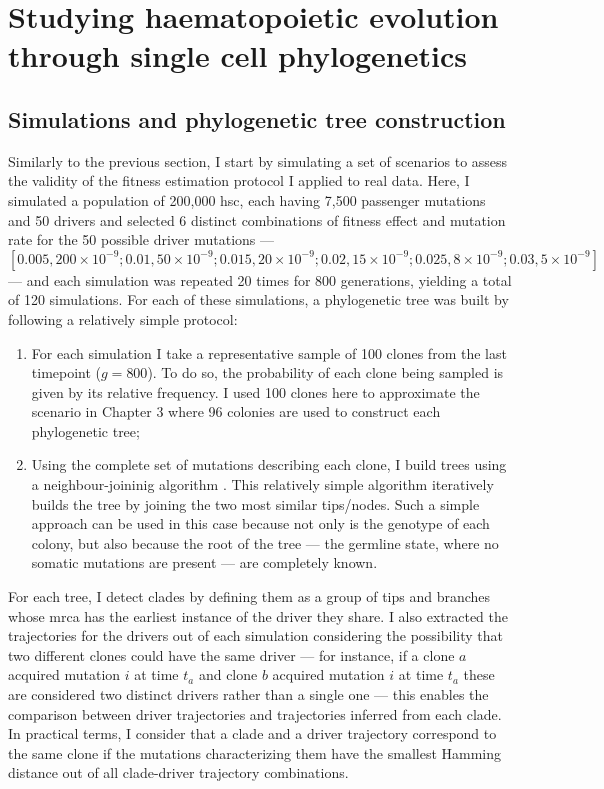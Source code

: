\section{Studying haematopoietic evolution through single cell phylogenetics}

\subsection{Simulations and phylogenetic tree construction}

Similarly to the previous section, I start by simulating a set of scenarios to assess the validity of the fitness estimation protocol I applied to real data. Here, I simulated a population of 200,000 \ac{hsc}, each having 7,500 passenger mutations and 50 drivers and selected 6 distinct combinations of fitness effect and mutation rate for the 50 possible driver mutations --- $[0.005,200 \times 10^{-9}; 0.01,50 \times 10^{-9}; 0.015,20 \times 10^{-9}; 0.02,15 \times 10^{-9}; 0.025,8 \times 10^{-9}; 0.03,5 \times 10^{-9}]$ --- and each simulation was repeated 20 times for 800 generations, yielding a total of 120 simulations. For each of these simulations, a phylogenetic tree was built by following a relatively simple protocol:

\begin{enumerate}
    \item For each simulation I take a representative sample of 100 clones from the last timepoint ($g = 800$). To do so, the probability of each clone being sampled is given by its relative frequency. I used 100 clones here to approximate the scenario in Chapter 3 where 96 colonies are used to construct each phylogenetic tree;
    \item Using the complete set of mutations describing each clone, I build trees using a neighbour-joininig algorithm \cite{Saitou1987-uq}. This relatively simple algorithm iteratively builds the tree by joining the two most similar tips/nodes. Such a simple approach can be used in this case because not only is the genotype of each colony, but also because the root of the tree --- the germline state, where no somatic mutations are present --- are completely known.
\end{enumerate}

For each tree, I detect clades by defining them as a group of tips and branches whose \ac{mrca} has the earliest instance of the driver they share. I also extracted the trajectories for the drivers out of each simulation considering the possibility that two different clones could have the same driver --- for instance, if a clone $a$ acquired mutation $i$ at time $t_a$ and clone $b$ acquired mutation $i$ at time $t_a$ these are considered two distinct drivers rather than a single one --- this enables the comparison between driver trajectories and trajectories inferred from each clade. In practical terms, I consider that a clade and a driver trajectory correspond to the same clone if the mutations characterizing them have the smallest Hamming distance out of all clade-driver trajectory combinations. 


